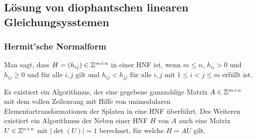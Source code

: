 	\subsection{Lösung von diophantschen linearen Gleichungsysstemen} 
	
	
	\subsubsection{Hermit'sche Normalform}
	
	Man sagt, dass $H = (h_{ij}) \in \mathbb Z^{m \times n}$ in einer HNF ist, wenn $m \le n$, $h_{ii} > 0$ und $h_{ij} \ge 0$ und für alle $i,j$ gilt und $h_{ij} < h_{jj}$ für alle $i,j$ mit $1 \le i < j \le m$ erfüllt ist. 
	
	\begin{thm}
		Es existiert ein Algorithmus, der eine gegebene ganzzahlige Matrix $A \in \mathbb Z^{m \times n}$ mit dem vollen Zeilenrang mit Hilfe von unimodularen Elementartransformationen der Splaten in eine HNF überführt. Des Weiteren existiert ein Algorithmus der Neben einer HNF $H$ von $A$ auch eine Matrix $U \in \mathbb Z^{n \times n}$ mit $|\det(U)|=1$ berechnet, für welche $H = A U$ gilt. 
	\end{thm} 
